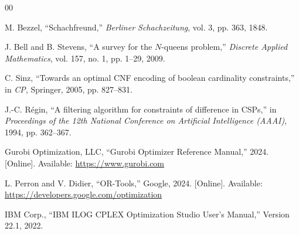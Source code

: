 \documentclass[a4paper,11pt]{article}
\begin{document}
\begin{thebibliography}{00}

M. Bezzel, ``Schachfreund,'' \emph{Berliner Schachzeitung}, vol. 3, pp. 363, 1848.

J. Bell and B. Stevens, ``A survey for the $N$-queens problem,'' \emph{Discrete Applied Mathematics}, vol. 157, no. 1, pp. 1--29, 2009.

C. Sinz, ``Towards an optimal CNF encoding of boolean cardinality constraints,'' in \emph{CP}, Springer, 2005, pp. 827--831.

J.-C. R\'{e}gin, ``A filtering algorithm for constraints of difference in CSPs,'' in \emph{Proceedings of the 12th National Conference on Artificial Intelligence (AAAI)}, 1994, pp. 362--367.

Gurobi Optimization, LLC, ``Gurobi Optimizer Reference Manual,'' 2024. [Online]. Available: \url{https://www.gurobi.com}

L. Perron and V. Didier, ``OR-Tools,'' Google, 2024. [Online]. Available: \url{https://developers.google.com/optimization}

IBM Corp., ``IBM ILOG CPLEX Optimization Studio User's Manual,'' Version 22.1, 2022.

\end{thebibliography}
\end{document}
